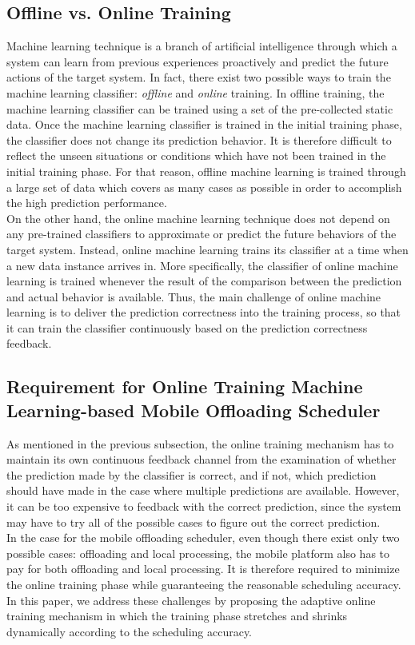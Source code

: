 \documentclass[10pt, conference, compsocconf]{IEEEtran}
\begin{document}
\subsection{Offline vs. Online Training}
%
Machine learning technique is a branch of artificial intelligence
through which a system can learn from previous experiences proactively
and predict the future actions of the target system.
%
In fact, there exist two possible ways to train the machine learning
classifier: \textit{offline} and \textit{online} training.
%
In offline training, the machine learning classifier can be trained
using a set of the pre-collected static data.
%
Once the machine learning classifier is trained in the initial training
phase, the classifier does not change its prediction behavior.
%
It is therefore difficult to reflect the unseen situations or conditions
which have not been trained in the initial training phase.
%
For that reason, offline machine learning is trained through a large set
of data which covers as many cases as possible in order to accomplish
the high prediction performance.\\
%
\indent On the other hand, the online machine learning technique does
not depend on any pre-trained classifiers to approximate or predict 
the future behaviors of the target system.
%
Instead, online machine learning trains its classifier at a time
when a new data instance arrives in.
%
More specifically, the classifier of online machine learning is trained
whenever the result of the comparison between the prediction and actual
behavior is available.
%
Thus, the main challenge of online machine learning is to deliver the
prediction correctness into the training process, so that it can train
the classifier continuously based on the prediction correctness feedback.
%
\subsection{Requirement for Online Training Machine Learning-based
Mobile Offloading Scheduler}
%
As mentioned in the previous subsection, the online training mechanism has
to maintain its own continuous feedback channel from the examination of
whether the prediction made by the classifier is correct, and if not,
which prediction should have made in the case where multiple predictions
are available.  
%
However, it can be too expensive to feedback with the correct
prediction, since the system may have to try all of the possible cases
to figure out the correct prediction.\\
%
\indent In the case for the mobile offloading scheduler, even though
there exist only two possible cases: offloading and local processing,
the mobile platform also has to pay for both offloading and local
processing.  
%
It is therefore required to minimize the online training phase while
guaranteeing the reasonable scheduling accuracy.
%
In this paper, we address these challenges by proposing the adaptive
online training mechanism in which the training phase stretches and
shrinks dynamically according to the scheduling accuracy. 
%
\end{document}
